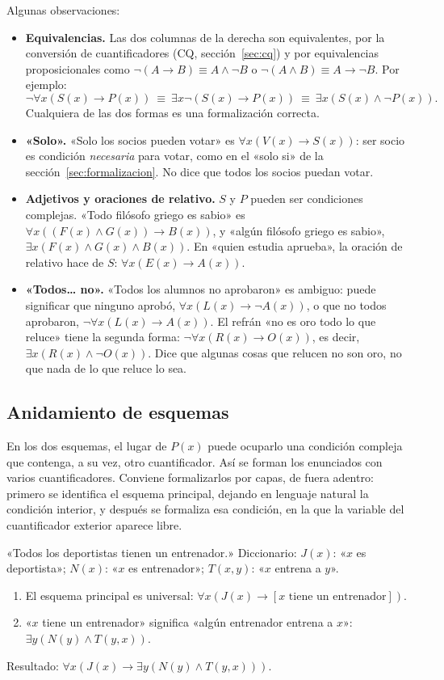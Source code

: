 Algunas observaciones:
\begin{itemize}
    \item \textbf{Equivalencias.} Las dos columnas de la derecha son equivalentes, por la conversión de cuantificadores (CQ, sección~\ref{sec:cq}) y por equivalencias proposicionales como $\neg(A \to B) \equiv A \land \neg B$ o $\neg(A \land B) \equiv A \to \neg B$. Por ejemplo:
    \[
    \neg \forall x (S(x) \to P(x)) \ \equiv\ \exists x \neg (S(x) \to P(x)) \ \equiv\ \exists x (S(x) \land \neg P(x)).
    \]
    Cualquiera de las dos formas es una formalización
    correcta. 
    \item \textbf{«Solo».} «Solo los socios pueden votar» es $\forall x (V(x) \to S(x))$: ser socio es condición \emph{necesaria} para votar, como en el «solo si» de la sección~\ref{sec:formalizacion}. No dice que todos los socios puedan votar.
    \item \textbf{Adjetivos y oraciones de relativo.} $S$ y $P$ pueden ser condiciones complejas. «Todo filósofo griego es sabio» es $\forall x ((F(x) \land G(x)) \to B(x))$, y «algún filósofo griego es sabio», $\exists x (F(x) \land G(x) \land B(x))$. En «quien estudia aprueba», la oración de relativo hace de $S$: $\forall x (E(x) \to A(x))$.
    \item \textbf{«Todos\ldots{} no».} «Todos los alumnos no aprobaron» es ambiguo: puede significar que ninguno aprobó, $\forall x (L(x) \to \neg A(x))$, o que no todos aprobaron, $\neg \forall x (L(x) \to A(x))$. El refrán «no es oro todo lo que reluce» tiene la segunda forma: $\neg \forall x (R(x) \to O(x))$, es decir, $\exists x (R(x) \land \neg O(x))$. Dice que algunas cosas que relucen no son oro, no que nada de lo que reluce lo sea.
\end{itemize}

\subsection{Anidamiento de esquemas}

En los dos esquemas, el lugar de $P(x)$ puede ocuparlo una condición
compleja que contenga, a su vez, otro cuantificador. Así se forman los
enunciados con varios cuantificadores. Conviene formalizarlos por
capas, de fuera adentro: primero se identifica el esquema principal,
dejando en lenguaje natural la condición interior, y después se formaliza esa condición, en la que la variable del cuantificador exterior aparece libre.

\begin{ejemplo}
«Todos los deportistas tienen un entrenador.» Diccionario: $J(x)$: «$x$ es deportista»; $N(x)$: «$x$ es entrenador»; $T(x, y)$: «$x$ entrena a $y$».
\begin{enumerate}
    \item El esquema principal es universal: $\forall x (J(x) \to [x \text{ tiene un entrenador}])$.
    \item «$x$ tiene un entrenador» significa «algún entrenador entrena a $x$»: $\exists y (N(y) \land T(y, x))$.
\end{enumerate}
Resultado: $\forall x (J(x) \to \exists y (N(y) \land T(y, x)))$.
\end{ejemplo}

